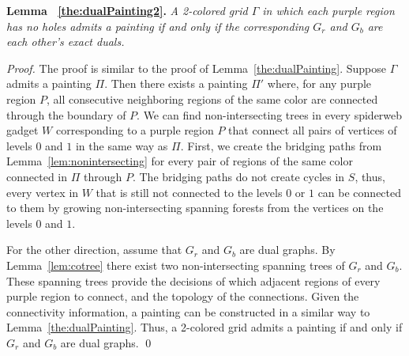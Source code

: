 \documentclass[runningheads]{llncs}
\newcommand{\cloneclaim}[2]{\medskip\noindent\textbf{#1.} \emph{#2}\smallskip}
\begin{document}
\cloneclaim{Lemma ~\ref{the:dualPainting2}}{A 2-colored grid $\Gamma$ in which each purple region has no holes admits a painting if and only if the corresponding $G_r$ and $G_b$ are each other's exact duals.}
\begin{proof}
The proof is similar to the proof of Lemma~\ref{the:dualPainting}.
Suppose $\Gamma$ admits a painting $\Pi$. Then there exists a painting $\Pi'$ where, for any purple region $P$, all consecutive neighboring regions of the same color are connected through the boundary of $P$. We can find non-intersecting trees in every spiderweb gadget $W$ corresponding to a purple region $P$ that connect all pairs of vertices of levels $0$ and $1$ in the same way as $\Pi$. First, we create the bridging paths from Lemma~\ref{lem:nonintersecting} for every pair of regions of the same color connected in $\Pi$ through $P$. The bridging paths do not create cycles in $S$, thus, every vertex in $W$ that is still not connected to the levels $0$ or $1$ can be connected to them by growing non-intersecting spanning forests from the vertices on the levels $0$ and $1$.

For the other direction, assume that $G_r$ and $G_b$ are dual graphs. By Lemma~\ref{lem:cotree} there exist two non-intersecting spanning trees of $G_r$ and $G_b$. These spanning trees provide the decisions of which adjacent regions of every purple region to connect, and the topology of the connections. Given the connectivity information, a painting can be constructed in a similar way to Lemma~\ref{the:dualPainting}. 
Thus, a 2-colored grid admits a painting if and only if $G_r$ and $G_b$ are dual graphs.
\hfill\qed
\end{proof}
\end{document}
